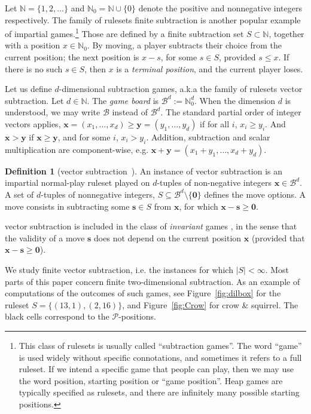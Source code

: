 \documentclass{amsart}
\theoremstyle{plain}
\theoremstyle{definition}
\newtheorem{defi}[thm]{Definition}
\renewcommand{\P}{\ensuremath{\mathcal P}}
\newcommand{\B}{\mathcal B}
\newcommand{\n}{\mathbb N}
\newcommand{\nz}{\mathbb N_0}
\newcommand{\x}{\boldsymbol x}
\newcommand{\y}{\boldsymbol y}
\newcommand{\s}{\boldsymbol s}
\renewcommand{\ge}{\geqslant}
\renewcommand{\le}{\leqslant}
\begin{document}
Let $\n=\{1,2,\ldots\}$ and $\nz=\n\cup\{0\}$ denote the positive and nonnegative integers respectively. The family of rulesets 
  {\sc finite subtraction} \cite{golomb1966mathematical, berlekamp2004winning} is another popular example of impartial games.\footnote{This class of rulesets is usually called ``subtraction games''. The word ``game'' is used widely without specific connotations, and sometimes it refers to a full ruleset. If we intend a specific game that people can play, then we may use the word position, starting position or ``game position''. Heap games are typically specified as  rulesets, and there are infinitely many possible starting positions.} Those are defined by a finite subtraction set $S\subset \n$, together with a position $x\in \nz$. By moving, a player subtracts their choice from the current position; the next position is $x-s$, for some $s\in S$, provided $s\le x$. If there is no such $s\in S$, then $x$ is a {\em terminal position}, and the current player loses.

 Let us define $d$-dimensional subtraction games, a.k.a the family of rulesets {\sc vector subtraction}. Let $d \in \n$.  The {\em game board} is $\B^d:=\nz^d $. When the dimension $d$ is understood, we may write $\B$ instead of $\B^d$. 
The standard partial order of integer vectors applies, $\boldsymbol x=(x_1,  \ldots,  x_d) \ge \boldsymbol y=(y_1, \ldots,  y_d)$
 if for all $i$, $x_i\ge y_i$. And $\boldsymbol x > \boldsymbol y$
 if $\x \ge \y$, and for some $i$, $x_i > y_i$. Addition, subtraction and scalar multiplication are component-wise, e.g. $\x +\y = (x_1+y_1,  \ldots,  x_d+y_d)$.

\begin{defi}[{\sc vector subtraction}~\cite{golomb1966mathematical,larsson2012operator}]
An instance of {\sc vector subtraction} is an impartial normal-play ruleset played on $d$-tuples of non-negative integers $\x\in \B^d$. A set of  $d$-tuples of nonnegative integers, $S\subseteq \B^d\setminus \{\boldsymbol 0\}$ defines the move options. A move consists in subtracting some $ \s \in  S$ from $\x$, for which  $\x-\s \ge \boldsymbol 0$. 
\end{defi}

{\sc vector subtraction} is included in the class of {\em invariant} games \cite{DuRi2010, LaHeFr2011} , in the sense that the validity of a move $\s$ does not depend on the current position $\x$ (provided that $\x-\s \ge \boldsymbol 0$).  

We study {\sc finite vector subtraction}, i.e. the instances for which $|S|<\infty$. 
Most parts of this paper concern  {\sc finite two-dimensional subtraction}. As an example of computations of the outcomes of such games, see  Figure~\ref{fig:dilbox} for the ruleset $S=\{(13,1),(2,16)\}$, and Figure~\ref{fig:Crow} for {\sc crow \& squirrel}. The black cells correspond to the \P-positions. 
\end{document}

